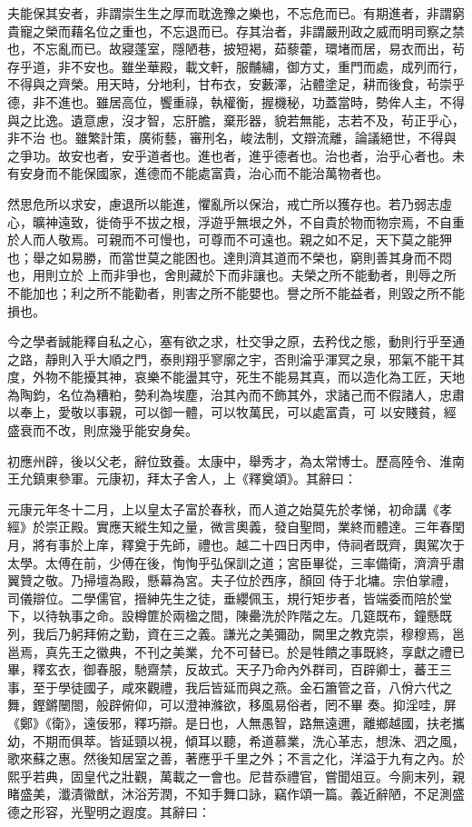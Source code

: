 \begin{pinyinscope}
 夫能保其安者，非謂崇生生之厚而耽逸豫之樂也，不忘危而已。有期進者，非謂窮貴寵之榮而藉名位之重也，不忘退而已。存其治者，非謂嚴刑政之威而明司察之禁也，不忘亂而已。故寢蓬室，隱陋巷，披短褐，茹藜藿，環堵而居，易衣而出，茍存乎道，非不安也。雖坐華殿，載文軒，服黼繡，御方丈，重門而處，成列而行，不得與之齊榮。用天時，分地利，甘布衣，安藪澤，沾體塗足，耕而後食，茍崇乎德，非不進也。雖居高位，饗重祿，執權衡，握機秘，功蓋當時，勢侔人主，不得與之比逸。遺意慮，沒才智，忘肝膽，棄形器，貌若無能，志若不及，茍正乎心，非不治
 也。雖繁計策，廣術藝，審刑名，峻法制，文辯流離，論議絕世，不得與之爭功。故安也者，安乎道者也。進也者，進乎德者也。治也者，治乎心者也。未有安身而不能保國家，進德而不能處富貴，治心而不能治萬物者也。



 然思危所以求安，慮退所以能進，懼亂所以保治，戒亡所以獲存也。若乃弱志虛心，曠神遠致，徙倚乎不拔之根，浮遊乎無垠之外，不自貴於物而物宗焉，不自重於人而人敬焉。可親而不可慢也，可尊而不可遠也。親之如不足，天下莫之能狎也；舉之如易勝，而當世莫之能困也。達則濟其道而不榮也，窮則善其身而不悶也，用則立於
 上而非爭也，舍則藏於下而非讓也。夫榮之所不能動者，則辱之所不能加也；利之所不能勸者，則害之所不能嬰也。譽之所不能益者，則毀之所不能損也。



 今之學者誠能釋自私之心，塞有欲之求，杜交爭之原，去矜伐之態，動則行乎至通之路，靜則入乎大順之門，泰則翔乎寥廓之宇，否則淪乎渾冥之泉，邪氣不能干其度，外物不能擾其神，哀樂不能盪其守，死生不能易其真，而以造化為工匠，天地為陶鈞，名位為糟粕，勢利為埃塵，治其內而不飾其外，求諸己而不假諸人，忠肅以奉上，愛敬以事親，可以御一體，可以牧萬民，可以處富貴，可
 以安賤貧，經盛衰而不改，則庶幾乎能安身矣。



 初應州辟，後以父老，辭位致養。太康中，舉秀才，為太常博士。歷高陸令、淮南王允鎮東參軍。元康初，拜太子舍人，上《釋奠頌》。其辭曰：



 元康元年冬十二月，上以皇太子富於春秋，而人道之始莫先於孝悌，初命講《孝經》於崇正殿。實應天縱生知之量，微言奧義，發自聖問，業終而體達。三年春閏月，將有事於上庠，釋奠于先師，禮也。越二十四日丙申，侍祠者既齊，輿駕次于太學。太傅在前，少傅在後，恂恂乎弘保訓之道；宮臣畢從，三率備衛，濟濟乎肅翼贊之敬。乃掃壇為殿，懸幕為宮。夫子位於西序，顏回
 侍于北墉。宗伯掌禮，司儀辯位。二學儒官，搢紳先生之徒，垂纓佩玉，規行矩步者，皆端委而陪於堂下，以待執事之命。設樽篚於兩楹之間，陳罍洗於阼階之左。几筵既布，鐘懸既列，我后乃躬拜俯之勤，資在三之義。謙光之美彌劭，闕里之教克崇，穆穆焉，邕邕焉，真先王之徽典，不刊之美業，允不可替已。於是牲饋之事既終，享獻之禮已畢，釋玄衣，御春服，馳齋禁，反故式。天子乃命內外群司，百辟卿士，蕃王三事，至于學徒國子，咸來觀禮，我后皆延而與之燕。金石簫管之音，八佾六代之舞，鏗鏘闛閤，般辟俯仰，可以澄神滌欲，移風易俗者，罔不畢
 奏。抑淫哇，屏《鄭》《衛》，遠佞邪，釋巧辯。是日也，人無愚智，路無遠邇，離鄉越國，扶老攜幼，不期而俱萃。皆延頸以視，傾耳以聽，希道慕業，洗心革志，想洙、泗之風，歌來蘇之惠。然後知居室之善，著應乎千里之外；不言之化，洋溢于九有之內。於熙乎若典，固皇代之壯觀，萬載之一會也。尼昔忝禮官，嘗聞俎豆。今廁末列，親睹盛美，瀸漬徽猷，沐浴芳潤，不知手舞口詠，竊作頌一篇。義近辭陋，不足測盛德之形容，光聖明之遐度。其辭曰：




\end{pinyinscope}
